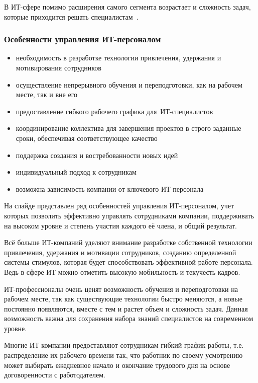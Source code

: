\documentclass{../industrial-development}
\begin{document}
	В ИТ-сфере помимо расширения самого сегмента возрастает и сложность задач, которые приходится решать специалистам~\cite{Bogatova}.
	
	\begin{frame} \frametitle{Особенности управления ИТ-персоналом}
		\begin{itemize}
			\item необходимость в разработке технологии привлечения, удержания и мотивирования сотрудников
			\item осуществление непрерывного обучения и переподготовки, как на рабочем месте, так и вне его
			\item предоставление гибкого рабочего графика для~ИТ-специалистов
			\item координирование коллектива для завершения проектов в строго заданные сроки, обеспечивая соответствующее качество
			\item поддержка создания и востребованности новых идей
			\item индивидуальный подход к сотрудникам
			\item возможна зависимость компании от ключевого ИТ-персонала
		\end{itemize}
		
	\end{frame}
	\lecturenotes
	
	На слайде представлен ряд особенностей управления ИТ-персоналом, учет которых позволить эффективно управлять сотрудниками компании, поддерживать на высоком уровне и степень участия каждого её члена, и общий результат.
	
	Всё больше ИТ-компаний уделяют внимание разработке собственной технологии привлечения, удержания и мотивации сотрудников, созданию определенной системы стимулов, которая будет способствовать эффективной работе персонала. Ведь в сфере ИТ можно отметить высокую мобильность и текучесть кадров.
	
	ИТ-профессионалы очень ценят возможность обучения и переподготовки на рабочем месте, так как существующие технологии быстро меняются, а новые постоянно появляются, вместе с тем и растет объем и сложность задач. Данная возможность важна для сохранения набора знаний специалистов на современном уровне. 
	
	Многие ИТ-компании предоставляют сотрудникам гибкий график работы, т.е. распределение их рабочего времени так, что работник по своему усмотрению может выбирать ежедневное начало и окончание трудового дня на основе договоренности с работодателем.
	
\end{document}
